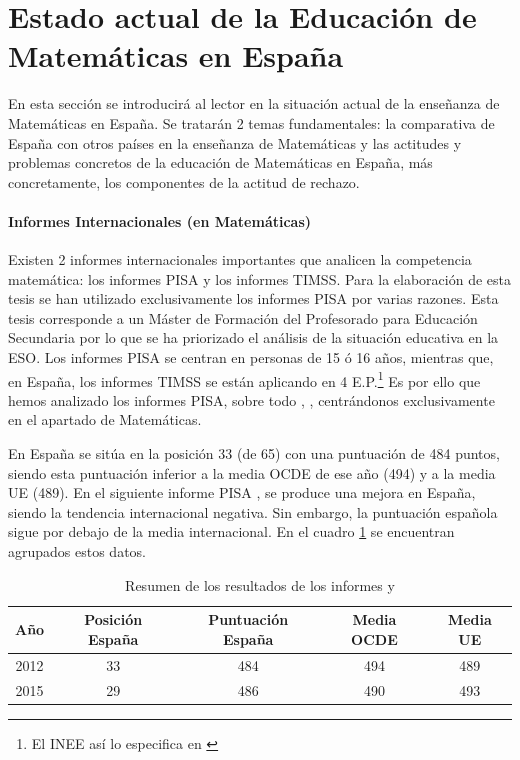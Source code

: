 \label{chap:intro} %


\section{Estado actual de la Educación de Matemáticas en España}
\label{sec:EstadoEducacionMates}

En esta sección se introducirá al lector en la situación actual de la enseñanza de Matemáticas en España. 
%
Se tratarán 2 temas fundamentales: la comparativa de España con otros países en la enseñanza de Matemáticas y las actitudes y problemas concretos de la educación de Matemáticas en España, más concretamente, los componentes de la actitud de rechazo.


\paragraph{Informes Internacionales (en Matemáticas)} 

Existen 2 informes internacionales importantes que analicen la competencia matemática: los informes \gls{PISA} y los informes \gls{TIMSS}. 
%
Para la elaboración de esta tesis se han utilizado exclusivamente los informes \gls{PISA} por varias razones. 
Esta tesis corresponde a un Máster de Formación del Profesorado para Educación Secundaria por lo que se ha priorizado el análisis de la situación educativa en la ESO.
%
Los informes \gls{PISA} se centran en personas de 15 ó 16 años, mientras que, en España, los informes \gls{TIMSS} se están aplicando en 4 E.P.\footnote{El \gls{INEE} así lo especifica en \cite{InformeTimss}} 
%
Es por ello que hemos analizado los informes \gls{PISA}, sobre todo , , centrándonos exclusivamente en el apartado de Matemáticas.

En  España se sitúa en la posición 33 (de 65) con una puntuación de 484 puntos, siendo esta puntuación inferior a la media OCDE de ese año (494) y a la media UE (489).
%
En el siguiente informe PISA , se produce una mejora en España, siendo la tendencia internacional negativa. 
%
Sin embargo, la puntuación española sigue por debajo de la media internacional.
%
En el cuadro \ref{tbl::ResumenPisa} se encuentran agrupados estos datos.

\begin{table}[hbtp]
\centering
\begin{tabular}{ccccc}
Año & Posición España & Puntuación España & Media OCDE & Media UE\\\hline
2012 & 33 & 484 & 494 & 489\\
2015 & 29 & 486 & 490 & 493
\end{tabular}
\caption{Resumen de los resultados de los informes  y }
\label{tbl::ResumenPisa}
\end{table}

